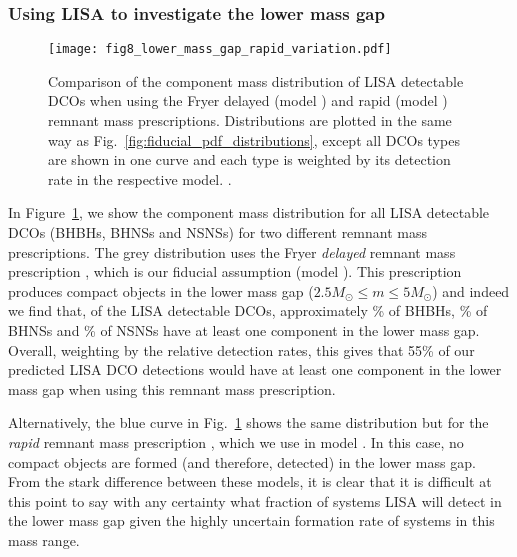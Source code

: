 \subsubsection{Using LISA to investigate the lower mass gap}\label{sec:lower_mass_gap}

\begin{figure}[tb]
    \centering
    \texttt{[image: fig8\_lower\_mass\_gap\_rapid\_variation.pdf]}
    \caption{Comparison of the component mass distribution of LISA detectable DCOs when using the Fryer delayed (model \modFid{}) and rapid (model \modRapid{}) remnant mass prescriptions. Distributions are plotted in the same way as Fig.~\ref{fig:fiducial_pdf_distributions}, except all DCOs types are shown in one curve and each type is weighted by its detection rate in the respective model. \href{https://github.com/TomWagg/detecting-DCOs-in-LISA/blob/main/paper/figures/fig8_lower_mass_gap_rapid_variation.pdf}{\faFileImage} \href{https://github.com/TomWagg/detecting-DCOs-in-LISA/blob/main/paper/figure_notebooks/variations.ipynb}{\faBook}.}
    \label{fig:lower_mass_gap_variation}
\end{figure}

In Figure~\ref{fig:lower_mass_gap_variation}, we show the component mass distribution for all LISA detectable DCOs (BHBHs, BHNSs and NSNSs) for two different remnant mass prescriptions. The grey distribution uses the Fryer \textit{delayed} remnant mass prescription \citep{Fryer+2012}, which is our fiducial assumption (model \modFid{}). This prescription produces compact objects in the lower mass gap ($2.5 \unit{M_{\odot}} \le m \le 5 \unit{M_{\odot}}$) and indeed we find that, of the LISA detectable DCOs, approximately \BHBHatLeastOneLowerMassGapPerc{}\% of BHBHs, \BHNSatLeastOneLowerMassGapPerc{}\% of BHNSs and \NSNSatLeastOneLowerMassGapPerc{}\% of NSNSs have at least one component in the lower mass gap. Overall, weighting by the relative detection rates, this gives that 55\% of our predicted LISA DCO detections would have at least one component in the lower mass gap when using this remnant mass prescription.

Alternatively, the blue curve in Fig.~\ref{fig:lower_mass_gap_variation} shows the same distribution but for the \textit{rapid} remnant mass prescription \citep{Fryer+2012}, which we use in model \modRapid{}. In this case, no compact objects are formed (and therefore, detected) in the lower mass gap. From the stark difference between these models, it is clear that it is difficult at this point to say with any certainty what fraction of systems LISA will detect in the lower mass gap given the highly uncertain formation rate of systems in this mass range.

